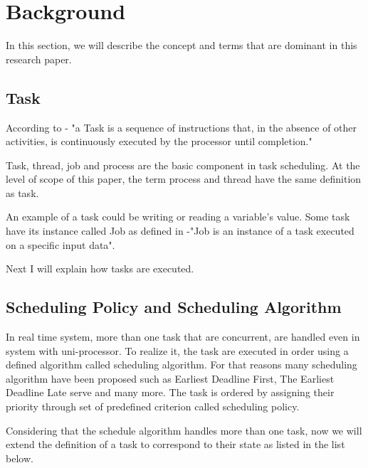 


\section{Background}
In this section, we will describe the concept and terms that are dominant in this research paper.

\subsection{Task}

According to \cite{b4}- "a Task is a sequence of instructions that, in the absence of other activities, is continuously executed by the processor until completion."

Task, thread, job and process  are the basic component in task scheduling. At the level of scope of this paper, the term process and thread have the same definition as task. 

An example of a task could be writing or reading a variable's value. Some task have its instance called Job as defined in \cite{b4}-"Job is an instance of a task executed on a specific input data". 

Next I will explain how tasks are executed.


\subsection{Scheduling Policy and Scheduling Algorithm }


In real time system, more than one task that are concurrent, are handled even in system with uni-processor. To realize it,  the task are executed in order using a defined algorithm called scheduling algorithm. For that reasons many scheduling algorithm have been proposed such as Earliest Deadline First, The Earliest Deadline Late serve and many more. The task is ordered by assigning their priority through set of predefined criterion called scheduling policy.\cite{b5}

Considering that the schedule algorithm handles more than one task, now we will extend the definition of a task to correspond to their state as listed in the list below.

